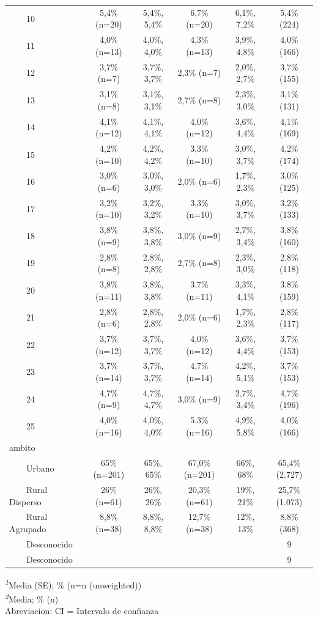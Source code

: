 \documentclass[
  spanish,
  a4paper,
]{scrreprt}
\begin{document}
\begin{table}
{\begin{tabular*}{\linewidth}{@{\extracolsep{\fill}}lccccc}
    10 & 5,4\% (n=20) & 5,4\%, 5,4\% & 6,7\% (n=20) & 6,1\%, 7,2\% & 5,4\% (224) \\ 
    11 & 4,0\% (n=13) & 4,0\%, 4,0\% & 4,3\% (n=13) & 3,9\%, 4,8\% & 4,0\% (166) \\ 
    12 & 3,7\% (n=7) & 3,7\%, 3,7\% & 2,3\% (n=7) & 2,0\%, 2,7\% & 3,7\% (155) \\ 
    13 & 3,1\% (n=8) & 3,1\%, 3,1\% & 2,7\% (n=8) & 2,3\%, 3,0\% & 3,1\% (131) \\ 
    14 & 4,1\% (n=12) & 4,1\%, 4,1\% & 4,0\% (n=12) & 3,6\%, 4,4\% & 4,1\% (169) \\ 
    15 & 4,2\% (n=10) & 4,2\%, 4,2\% & 3,3\% (n=10) & 3,0\%, 3,7\% & 4,2\% (174) \\ 
    16 & 3,0\% (n=6) & 3,0\%, 3,0\% & 2,0\% (n=6) & 1,7\%, 2,3\% & 3,0\% (125) \\ 
    17 & 3,2\% (n=10) & 3,2\%, 3,2\% & 3,3\% (n=10) & 3,0\%, 3,7\% & 3,2\% (133) \\ 
    18 & 3,8\% (n=9) & 3,8\%, 3,8\% & 3,0\% (n=9) & 2,7\%, 3,4\% & 3,8\% (160) \\ 
    19 & 2,8\% (n=8) & 2,8\%, 2,8\% & 2,7\% (n=8) & 2,3\%, 3,0\% & 2,8\% (118) \\ 
    20 & 3,8\% (n=11) & 3,8\%, 3,8\% & 3,7\% (n=11) & 3,3\%, 4,1\% & 3,8\% (159) \\ 
    21 & 2,8\% (n=6) & 2,8\%, 2,8\% & 2,0\% (n=6) & 1,7\%, 2,3\% & 2,8\% (117) \\ 
    22 & 3,7\% (n=12) & 3,7\%, 3,7\% & 4,0\% (n=12) & 3,6\%, 4,4\% & 3,7\% (153) \\ 
    23 & 3,7\% (n=14) & 3,7\%, 3,7\% & 4,7\% (n=14) & 4,2\%, 5,1\% & 3,7\% (153) \\ 
    24 & 4,7\% (n=9) & 4,7\%, 4,7\% & 3,0\% (n=9) & 2,7\%, 3,4\% & 4,7\% (196) \\ 
    25 & 4,0\% (n=16) & 4,0\%, 4,0\% & 5,3\% (n=16) & 4,9\%, 5,8\% & 4,0\% (166) \\ 
ambito &  &  &  &  &  \\ 
    Urbano & 65\% (n=201) & 65\%, 65\% & 67,0\% (n=201) & 66\%, 68\% & 65,4\% (2.727) \\ 
    Rural Disperso & 26\% (n=61) & 26\%, 26\% & 20,3\% (n=61) & 19\%, 21\% & 25,7\% (1.073) \\ 
    Rural Agrupado & 8,8\% (n=38) & 8,8\%, 8,8\% & 12,7\% (n=38) & 12\%, 13\% & 8,8\% (368) \\ 
    Desconocido &  &  &  &  & 9 \\ 
    Desconocido &  &  &  &  & 9 \\ 
\bottomrule
\end{tabular*}
\begin{minipage}{\linewidth}
\textsuperscript{\textit{1}}Media (SE); \% (n=n (unweighted))\\
\textsuperscript{\textit{2}}Media; \% (n)\\
Abreviacion: CI = Intervalo de confianza\\
\end{minipage}

}

\end{table}%
\end{document}
